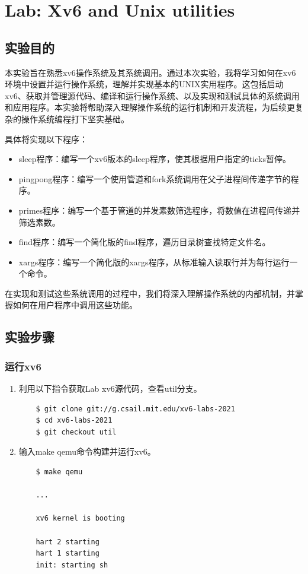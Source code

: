 \section{Lab: Xv6 and Unix utilities}
\subsection{实验目的}

本实验旨在熟悉xv6操作系统及其系统调用。通过本次实验，我将学习如何在xv6环境中设置并运行操作系统，理解并实现基本的UNIX实用程序。这包括启动xv6、获取并管理源代码、编译和运行操作系统、以及实现和测试具体的系统调用和应用程序。本实验将帮助深入理解操作系统的运行机制和开发流程，为后续更复杂的操作系统编程打下坚实基础。

具体将实现以下程序：
\begin{itemize}
    \item sleep程序：编写一个xv6版本的sleep程序，使其根据用户指定的ticks暂停。
    \item pingpong程序：编写一个使用管道和fork系统调用在父子进程间传递字节的程序。
    \item primes程序：编写一个基于管道的并发素数筛选程序，将数值在进程间传递并筛选素数。
    \item find程序：编写一个简化版的find程序，遍历目录树查找特定文件名。
    \item xargs程序：编写一个简化版的xargs程序，从标准输入读取行并为每行运行一个命令。
\end{itemize}

在实现和测试这些系统调用的过程中，我们将深入理解操作系统的内部机制，并掌握如何在用户程序中调用这些功能。
\subsection{实验步骤}
\subsubsection{运行xv6}
\begin{enumerate}
    \item 利用以下指令获取Lab xv6源代码，查看util分支。
          \begin{lstlisting}
    $ git clone git://g.csail.mit.edu/xv6-labs-2021
    $ cd xv6-labs-2021
    $ git checkout util
        \end{lstlisting}
    \item 输入make qemu命令构建并运行xv6。
          \begin{lstlisting}
    $ make qemu
    
    ...

    xv6 kernel is booting

    hart 2 starting
    hart 1 starting
    init: starting sh
        \end{lstlisting}
\end{enumerate}

